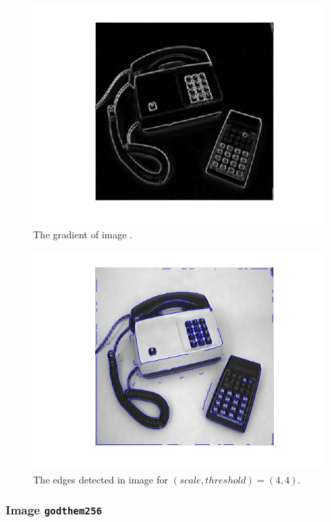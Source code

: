     \begin{figure}[H]
      \centering
      \includegraphics[scale=0.8]{./images/Q8/phonecalc256/3.png}
      \caption{The gradient of image .}
      \label{fig:Q8_phonecalc256_3}
    \end{figure}

    \begin{figure}[H]
      \centering
      \includegraphics[scale=0.8]{./images/Q8/phonecalc256/4.png}
      \caption{The edges detected in image  for
        $(scale, threshold) = (4,4)$.}
      \label{fig:Q8_phonecalc256_4}
    \end{figure}


  \subsubsection{Image \texttt{godthem256}}

